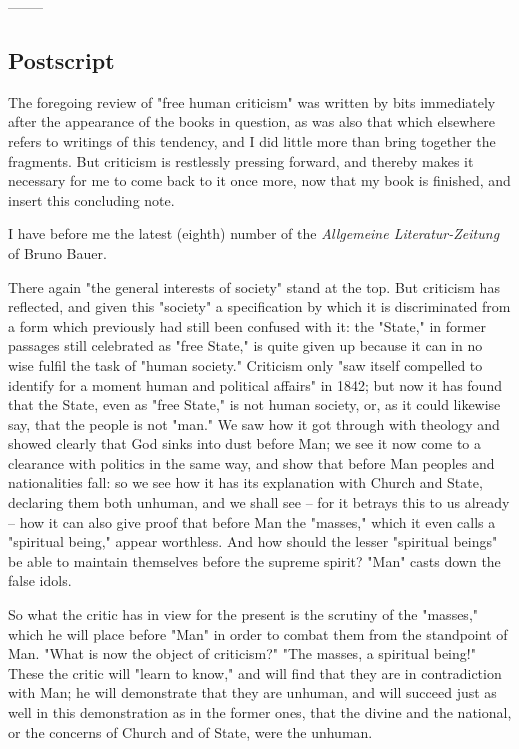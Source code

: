 \begin{center}
--------\end{center}


\subsection[Postscript]{\centering Postscript}

The foregoing review of "{}free human criticism"{} was written by bits 
immediately after the appearance of the books in question, as was also that 
which elsewhere refers to writings of this tendency, and I did little more 
than bring together the fragments. But criticism is restlessly pressing 
forward, and thereby makes it necessary for me to come back to it once more, 
now that my book is finished, and insert this concluding note.

I have before me the latest (eighth) number of the \textit{Allgemeine 
Literatur-Zeitung} of Bruno Bauer.

There again "{}the general interests of society"{} stand at the top. But 
criticism has reflected, and given this "{}society"{} a specification by which 
it is discriminated from a form which previously had still been confused with 
it: the "{}State,"{} in former passages still celebrated as "{}free State,"{} 
is quite given up because it can in no wise fulfil the task of "{}human 
society."{} Criticism only "{}saw itself compelled to identify for a moment 
human and political affairs"{} in 1842; but now it has found that the State, 
even as "{}free State,"{} is not human society, or, as it could likewise say, 
that the people is not "{}man."{} We saw how it got through with theology and 
showed clearly that God sinks into dust before Man; we see it now come to a 
clearance with politics in the same way, and show that before Man peoples and 
nationalities fall: so we see how it has its explanation with Church and 
State, declaring them both unhuman, and we shall see -- for it betrays this to 
us already -- how it can also give proof that before Man the "{}masses,"{} 
which it even calls a "{}spiritual being,"{} appear worthless. And how should 
the lesser "{}spiritual beings"{} be able to maintain themselves before the 
supreme spirit? "{}Man"{} casts down the false idols.

So what the critic has in view for the present is the scrutiny of the 
"{}masses,"{} which he will place before "{}Man"{} in order to combat them 
from the standpoint of Man. "{}What is now the object of criticism?"{} "{}The 
masses, a spiritual being!"{} These the critic will "{}learn to know,"{} and 
will find that they are in contradiction with Man; he will demonstrate that 
they are unhuman, and will succeed just as well in this demonstration as in 
the former ones, that the divine and the national, or the concerns of Church 
and of State, were the unhuman.

